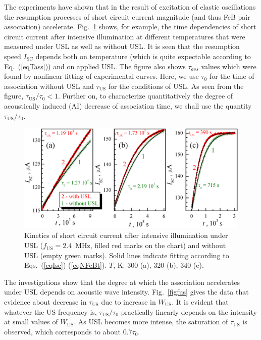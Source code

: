 The experiments have shown that in the result of excitation of elastic oscillations
the resumption processes of short circuit current magnitude (and thus FeB pair association) accelerate.
Fig.~\ref{figIscUs} shows, for example, the time dependencies of short circuit current
after intensive illumination at different temperatures
that were measured under USL as well as without USL.
It is seen that the resumption speed $I_\mathrm{SC}$ depends both on temperature
(which is quite expectable according to Eq.~(\ref{eqTass})) and on applied USL.
The figure also shows $\tau_{ass}$ values which were found by nonlinear fitting of experimental curves.
Here, we use $\tau_{0}$ for the time of association without USL
and $\tau_\mathrm{US}$ for the conditions of USL.
As seen from the figure, $\tau_\mathrm{US}/\tau_{0}< 1$.
Further on, to characterize quantitatively the degree of
acoustically induced (AI) decrease of association time, we shall use the quantity $\tau_\mathrm{US}/\tau_{0}$.

\begin{figure}
 \includegraphics[width=1.0\textwidth]{Fig3}
\caption{
Kinetics of short circuit current  after intensive illumination under USL
($f_\mathrm{US} = 2.4$~MHz, filled red marks on the chart)
and without USL (empty green marks).
Solid lines indicate fitting according to Eqs.~(\ref{eqIsc})-(\ref{eqNFeBt}).
$T$, K: 300 (a), 320 (b), 340 (c).
}
\label{figIscUs}       %
\end{figure}

The investigations show that the degree at which the association accelerates
under USL depends on acoustic wave intensity.
Fig.~\ref{figfus} gives the data that evidence about decrease
in $\tau_\mathrm{US}$ due to increase in $W_\mathrm{US}$.
It is evident that whatever the US frequency is, $\tau_\mathrm{US}/\tau_{0}$
practically linearly depends on the intensity at small values of $W_\mathrm{US}$.
As USL becomes more intense, the saturation of $\tau_\mathrm{US}$ is observed,
which corresponds to about 0.7$\tau_{0}$.


